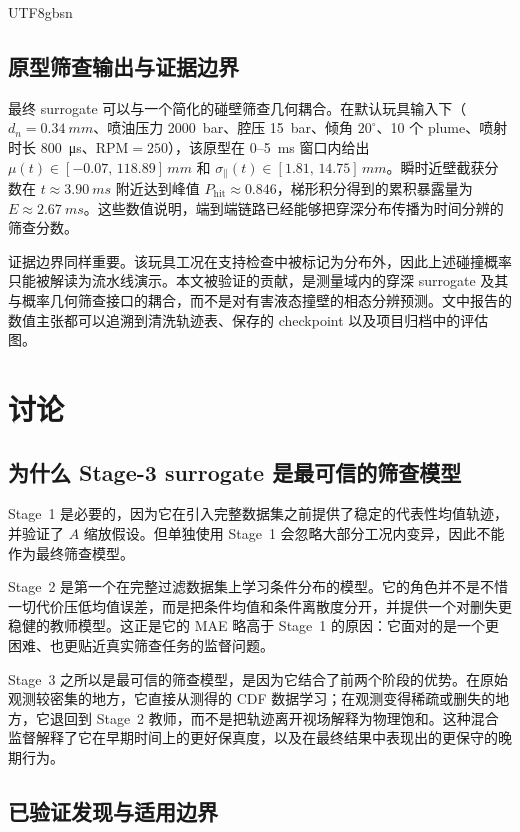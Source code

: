 \documentclass[english, 12pt, a4paper, elec, utf8, a-2b, online]{aaltothesis}
\begin{document}
\begin{CJK*}{UTF8}{gbsn}
\subsection{原型筛查输出与证据边界}

最终 surrogate 可以与一个简化的碰壁筛查几何耦合。在默认玩具输入下（$d_n=\SI{0.34}{mm}$、喷油压力 \SI{2000}{bar}、腔压 \SI{15}{bar}、倾角 $20^{\circ}$、10 个 plume、喷射时长 \SI{800}{\micro s}、$\mathrm{RPM}=250$），该原型在 0--\SI{5}{ms} 窗口内给出 $\mu(t)\in[-0.07,\,118.89]\,\si{mm}$ 和 $\sigma_{\parallel}(t)\in[1.81,\,14.75]\,\si{mm}$。瞬时近壁截获分数在 $t\approx\SI{3.90}{ms}$ 附近达到峰值 $P_{\mathrm{hit}}\approx0.846$，梯形积分得到的累积暴露量为 $E\approx\SI{2.67}{ms}$。这些数值说明，端到端链路已经能够把穿深分布传播为时间分辨的筛查分数。

证据边界同样重要。该玩具工况在支持检查中被标记为分布外，因此上述碰撞概率只能被解读为流水线演示。本文被验证的贡献，是测量域内的穿深 surrogate 及其与概率几何筛查接口的耦合，而不是对有害液态撞壁的相态分辨预测。文中报告的数值主张都可以追溯到清洗轨迹表、保存的 checkpoint 以及项目归档中的评估图。

\section{讨论}

\subsection{为什么 Stage-3 surrogate 是最可信的筛查模型}

Stage~1 是必要的，因为它在引入完整数据集之前提供了稳定的代表性均值轨迹，并验证了 $A$ 缩放假设。但单独使用 Stage~1 会忽略大部分工况内变异，因此不能作为最终筛查模型。

Stage~2 是第一个在完整过滤数据集上学习条件分布的模型。它的角色并不是不惜一切代价压低均值误差，而是把条件均值和条件离散度分开，并提供一个对删失更稳健的教师模型。这正是它的 MAE 略高于 Stage~1 的原因：它面对的是一个更困难、也更贴近真实筛查任务的监督问题。

Stage~3 之所以是最可信的筛查模型，是因为它结合了前两个阶段的优势。在原始观测较密集的地方，它直接从测得的 CDF 数据学习；在观测变得稀疏或删失的地方，它退回到 Stage~2 教师，而不是把轨迹离开视场解释为物理饱和。这种混合监督解释了它在早期时间上的更好保真度，以及在最终结果中表现出的更保守的晚期行为。

\subsection{已验证发现与适用边界}


\end{CJK*}
\end{document}
